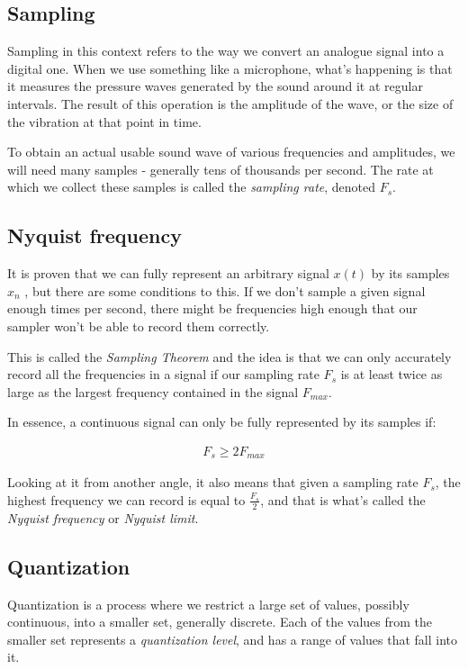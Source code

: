 \subsection{Sampling}
Sampling in this context refers to the way we convert an analogue signal into a digital one. When we use something like a microphone, what's happening is that it measures the pressure waves generated by the sound around it at regular intervals. The result of this operation is the amplitude of the wave, or the size of the vibration at that point in time.

To obtain an actual usable sound wave of various frequencies and amplitudes, we will need many samples - generally tens of thousands per second. The rate at which we collect these samples is called the \emph{sampling rate}, denoted $F_s$.

\subsection{Nyquist frequency}
It is proven that we can fully represent an arbitrary signal $x(t)$ by its samples $x_n$ \cite{bosi_goldberg_2003}, but there are some conditions to this. If we don't sample a given signal enough times per second, there might be frequencies high enough that our sampler won't be able to record them correctly.

This is called the \emph{Sampling Theorem} and the idea is that we can only accurately record all the frequencies in a signal if our sampling rate $F_s$ is at least twice as large as the largest frequency contained in the signal $F_{max}$. \cite{shannon_sampling_1991}

In essence, a continuous signal can only be fully represented by its samples if:

\begin{align}
F_s \ge 2F_{max}
\end{align}

Looking at it from another angle, it also means that given a sampling rate $F_s$, the highest frequency we can record is equal to $\frac{F_s}{2}$, and that is what's called the \emph{Nyquist frequency} or \emph{Nyquist limit}.

\subsection{Quantization}
Quantization is a process where we restrict a large set of values, possibly continuous, into a smaller set, generally discrete. Each of the values from the smaller set represents a \emph{quantization level}, and has a range of values that fall into it.

